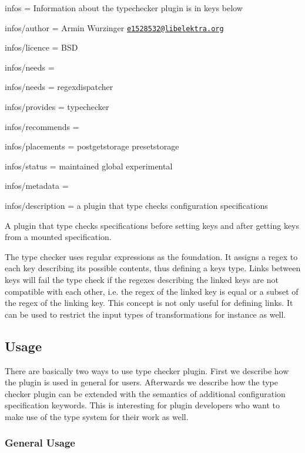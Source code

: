 
\begin{DoxyItemize}
\item infos = Information about the typechecker plugin is in keys below
\item infos/author = Armin Wurzinger \href{mailto:e1528532@libelektra.org}{\tt e1528532@libelektra.\+org}
\item infos/licence = B\+SD
\item infos/needs =
\item infos/needs = regexdispatcher
\item infos/provides = typechecker
\item infos/recommends =
\item infos/placements = postgetstorage presetstorage
\item infos/status = maintained global experimental
\item infos/metadata =
\item infos/description = a plugin that type checks configuration specifications
\end{DoxyItemize}

A plugin that type checks specifications before setting keys and after getting keys from a mounted specification.

The type checker uses regular expressions as the foundation. It assigns a regex to each key describing its possible contents, thus defining a key\textquotesingle{}s type. Links between keys will fail the type check if the regexes describing the linked keys are not compatible with each other, i.\+e. the regex of the linked key is equal or a subset of the regex of the linking key. This concept is not only useful for defining links. It can be used to restrict the input types of transformations for instance as well.

\subsection*{Usage}

There are basically two ways to use type checker plugin. First we describe how the plugin is used in general for users. Afterwards we describe how the type checker plugin can be extended with the semantics of additional configuration specification keywords. This is interesting for plugin developers who want to make use of the type system for their work as well.

\subsubsection*{General Usage}

